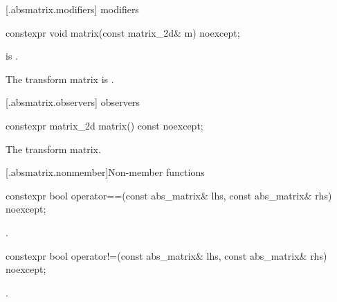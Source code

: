  [\iotwod.absmatrix.modifiers]{ modifiers}

%
\begin{itemdecl}
constexpr void matrix(const matrix_2d& m) noexcept;
\end{itemdecl}
\begin{itemdescr}
\pnum
\requires
{} is .

\pnum
\effects
The transform matrix is .
\end{itemdescr}

 [\iotwod.absmatrix.observers]{ observers}

%
\begin{itemdecl}
constexpr matrix_2d matrix() const noexcept;
\end{itemdecl}
\begin{itemdescr}
\pnum
\returns
The transform matrix.
\end{itemdescr}

 [\iotwod.absmatrix.nonmember]{Non-member functions}

%
\begin{itemdecl}
constexpr bool operator==(const abs_matrix& lhs, const abs_matrix& rhs) 
  noexcept;
\end{itemdecl}
\begin{itemdescr}
\pnum
\returns
{}.
\end{itemdescr}

%
\begin{itemdecl}
constexpr bool operator!=(const abs_matrix& lhs, const abs_matrix& rhs) 
  noexcept;
\end{itemdecl}
\begin{itemdescr}
\pnum
\returns
{}.
\end{itemdescr}

